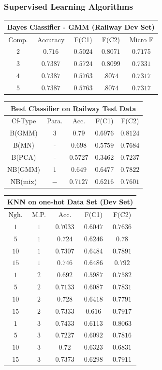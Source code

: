 \documentclass[12pt,journal,compsoc]{IEEEtran}
\begin{document}
\subsubsection{Supervised Learning Algorithms}
\begin{center}
\begin{tabular}{|c|c|c|c|c|}
\multicolumn{5}{c}{Bayes Classifier - GMM (Railway Dev Set)}\\
\hline
Comp. & Accuracy & F(C1) & F(C2) & Micro F\\
\hline
$2$ &$0.716$ &$0.5024$ &$0.8071$ &$0.7175$ \\
\hline
$3$ &$0.7387$ &$0.5724$ &$0.8099$ &$0.7331$ \\
\hline
$4$ &$0.7387$ &$0.5763$ &$.8074$ &$0.7317$ \\
\hline
$5$ &$0.7387$ &$0.5763$ &$.8074$ &$0.7317$ \\
\hline
\end{tabular}
\newline

\begin{tabular}{|c|c|c|c|c|}
\multicolumn{5}{c}{Best Classifier on Railway Test Data}\\
\hline
Cf-Type & Para. & Acc. & F(C1) & F(C2) \\
\hline
B(GMM) &$3$ &$0.79$ &$0.6976$ &$0.8124$ \\
\hline
B(MN) &- &$0.698$ &$0.5759$ &$0.7684$ \\
\hline
B(PCA) &- &$0.5727$ &$0.3462$ &$0.7237$ \\
\hline
NB(GMM) &$1$ &$0.649$ &$0.6477$ &$0.7822$  \\
\hline
NB(mix) &$-$ &$0.7127$ &$0.6216$ &$0.7601$ \\
\hline
\end{tabular}

\begin{tabular}{|c|c|c|c|c|}
\multicolumn{5}{c}{KNN on one-hot Data Set (Dev Set)}\\
\hline
Ngh. & M.P. & Acc. & F(C1) & F(C2) \\
\hline
$1$ &$1$ &$0.7033$ &$0.6047$ &$0.7636$ \\
\hline
$5$ &$1$ &$0.724$ &$0.6246$ &$0.78$\\
\hline
$10$ &$1$ &$0.7307$ &$0.6484$ &$0.7891$ \\
\hline
$15$ &$1$ &$0.746$ &$0.6486$ &$0.792$ \\
\hline
$1$ &$2$ &$0.692$ &$0.5987$ &$0.7582$ \\
\hline
$5$ &$2$ &$0.7133$ &$0.6087$ &$0.7831$ \\
\hline
$10$ &$2$ &$0.728$ &$0.6418$ &$0.7791$ \\
\hline
$15$ &$2$ &$0.7333$ &$0.616$ &$0.7917$ \\
\hline
$1$ &$3$ &$0.7433$ &$0.6113$ &$0.8063$ \\
\hline
$5$ &$3$ &$0.7227$ &$0.6092$ &$0.7816$ \\
\hline
$10$ &$3$ &$0.72$ &$0.6323$ &$0.6831$ \\
\hline
$15$ &$3$ &$0.7373$ &$0.6298$ &$0.7911$ \\
\hline
\end{tabular}
\end{center}
\end{document}
